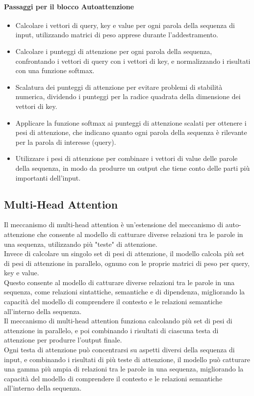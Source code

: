 \paragraph{Passaggi per il blocco Autoattenzione}
\begin{itemize}
    \item Calcolare i vettori di query, key e value per ogni parola della sequenza di input, utilizzando matrici di peso apprese durante l'addestramento.
    \item Calcolare i punteggi di attenzione per ogni parola della sequenza, confrontando i vettori di query con i vettori di key, e normalizzando i risultati con una funzione softmax.
    \item Scalatura dei punteggi di attenzione per evitare problemi di stabilità numerica, dividendo i punteggi per la radice quadrata della dimensione dei vettori di key.
    \item Applicare la funzione softmax ai punteggi di attenzione scalati per ottenere i pesi di attenzione, che indicano quanto ogni parola della sequenza è rilevante per la parola di interesse (query).
    \item Utilizzare i pesi di attenzione per combinare i vettori di value delle parole della sequenza, in modo da produrre un output che tiene conto delle parti più importanti dell'input.
\end{itemize}  

\subsection{Multi-Head Attention}

Il meccanismo di multi-head attention è un'estensione del meccanismo di auto-attenzione che consente al modello di catturare diverse relazioni tra le parole in una sequenza, utilizzando più "teste" di attenzione.\\
Invece di calcolare un singolo set di pesi di attenzione, il modello calcola più set di pesi di attenzione in parallelo, ognuno con le proprie matrici di peso per query, key e value.\\
Questo consente al modello di catturare diverse relazioni tra le parole in una sequenza, come relazioni sintattiche, semantiche e di dipendenza, migliorando la capacità del modello di comprendere il contesto e le
relazioni semantiche all'interno della sequenza.\\
Il meccanismo di multi-head attention funziona calcolando più set di pesi di attenzione in parallelo, e poi combinando i risultati di ciascuna testa di attenzione per produrre l'output finale.\\
Ogni testa di attenzione può concentrarsi su aspetti diversi della sequenza di input, e combinando i risultati di più teste di attenzione, il modello può catturare una gamma più ampia di relazioni tra le parole in una sequenza, 
migliorando la capacità del modello di comprendere il contesto e le relazioni semantiche all'interno della sequenza.\\

